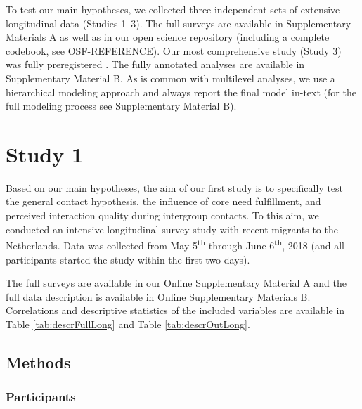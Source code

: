 \documentclass[man, 12pt, a4paper]{apa7}
\theoremstyle{break}
\theoremstyle{plain}
\begin{document}
To test our main hypotheses, we collected three independent sets of extensive longitudinal data (Studies 1–3). The full surveys are available in Supplementary Materials A as well as in our open science repository (including a complete codebook, see OSF-REFERENCE). Our most comprehensive study (Study 3) was fully preregistered  \citep[available at][]{Kreienkamp2021f}. The fully annotated analyses are available in Supplementary Material B. As is common with multilevel analyses, we use a hierarchical modeling approach and always report the final model in-text (for the full modeling process see Supplementary Material B).

\section{Study 1}

Based on our main hypotheses, the aim of our first study is to
specifically test the general contact hypothesis, the influence of core
need fulfillment, and perceived interaction quality during intergroup
contacts. To this aim, we conducted an intensive longitudinal survey
study with recent migrants to the Netherlands. Data was collected from
May 5\textsuperscript{th} through June 6\textsuperscript{th}, 2018 (and
all participants started the study within the first two days).

The full surveys are available in our Online Supplementary Material A
and the full data description is available in Online Supplementary
Materials B. Correlations and descriptive statistics of the included
variables are available in Table \ref{tab:descrFullLong} and Table
\ref{tab:descrOutLong}.

\subsection{Methods}

\subsubsection{Participants}
\end{document}
